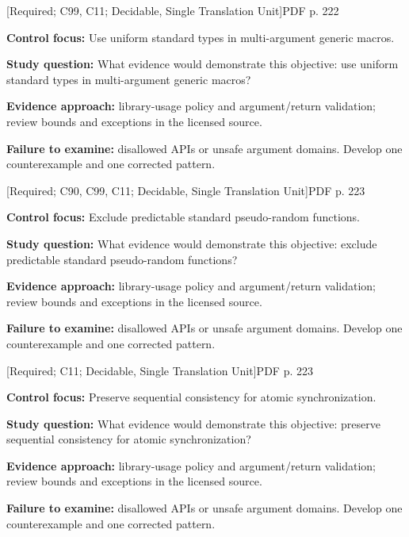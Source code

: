 \documentclass[10pt,letterpaper]{article}
\begin{document}
\smallskip
{}
 \textsf{\footnotesize [Required; C99, C11; Decidable, Single Translation Unit]}\hfill{\footnotesize PDF p. 222}\par
\textbf{Control focus:} Use uniform standard types in multi-argument generic macros.\par
\textbf{Study question:} What evidence would demonstrate this objective: use uniform standard types in multi-argument generic macros?\par
\textbf{Evidence approach:} library-usage policy and argument/return validation; review bounds and exceptions in the licensed source.\par
\textbf{Failure to examine:} disallowed APIs or unsafe argument domains. Develop one counterexample and one corrected pattern.\par
\smallskip
{}
 \textsf{\footnotesize [Required; C90, C99, C11; Decidable, Single Translation Unit]}\hfill{\footnotesize PDF p. 223}\par
\textbf{Control focus:} Exclude predictable standard pseudo-random functions.\par
\textbf{Study question:} What evidence would demonstrate this objective: exclude predictable standard pseudo-random functions?\par
\textbf{Evidence approach:} library-usage policy and argument/return validation; review bounds and exceptions in the licensed source.\par
\textbf{Failure to examine:} disallowed APIs or unsafe argument domains. Develop one counterexample and one corrected pattern.\par
\smallskip
{}
 \textsf{\footnotesize [Required; C11; Decidable, Single Translation Unit]}\hfill{\footnotesize PDF p. 223}\par
\textbf{Control focus:} Preserve sequential consistency for atomic synchronization.\par
\textbf{Study question:} What evidence would demonstrate this objective: preserve sequential consistency for atomic synchronization?\par
\textbf{Evidence approach:} library-usage policy and argument/return validation; review bounds and exceptions in the licensed source.\par
\textbf{Failure to examine:} disallowed APIs or unsafe argument domains. Develop one counterexample and one corrected pattern.\par
\end{document}
